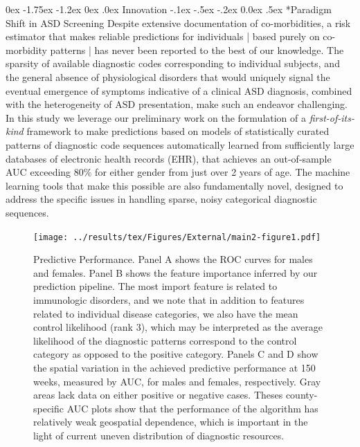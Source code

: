 \documentclass[onecolumn, compsoc,11pt]{IEEEtran}
\makeatletter
\renewcommand\subsection{\@startsection {subsection}{2}{\z@}%
                                   {0ex \@plus -1.75ex \@minus -1.2ex}%
                                   {0ex \@plus.0ex}%
                                   {\fontsize{11}{11}\selectfont\bfseries\sffamily\color{black}}}
\renewcommand\paragraph{\@startsection {section}{1}{\z@}%
                                   {-.1ex \@plus -.5ex \@minus -.2ex}%
                                   {0.0ex \@plus.5ex}%
                                   {\fontsize{11}{10}\selectfont\bfseries\itshape\sffamily\color{black}}}
\renewcommand{\captionN}[1]{\caption{\color{CadetBlue4!80!black} \sffamily \fontsize{9}{10}\selectfont #1  }}
\def\treatment{positive\xspace}
\makeatother
\begin{document}
 \subsection{Innovation}
\paragraph*{Paradigm Shift in ASD Screening} Despite extensive documentation of co-morbidities,   a risk estimator that makes reliable predictions for  individuals | based purely on co-morbidity patterns |  has never been reported to the best of our knowledge. The sparsity of available diagnostic codes corresponding to 
individual subjects, and the general absence of physiological disorders  that would uniquely signal the eventual emergence of symptoms indicative of a clinical ASD diagnosis, combined with the heterogeneity of ASD presentation,  make such an endeavor challenging. In this study we leverage our preliminary work on  the  formulation of a \textit{first-of-its-kind}  framework to make predictions 
based on models of statistically curated patterns of diagnostic code sequences automatically learned from  sufficiently large databases of electronic health records (EHR), that  achieves an out-of-sample AUC exceeding  $80\%$ for  either gender from just over 2 years of age. The machine learning tools that make this possible are also fundamentally novel, designed to address the specific issues in handling sparse, noisy categorical diagnostic sequences. 
\begin{figure}[t]
  \texttt{[image: ../results/tex/Figures/External/main2-figure1.pdf]}
     \vspace{-15pt}

  \captionN{Predictive Performance. Panel 
       A shows the ROC curves for males and females. Panel B shows the feature importance inferred by our prediction pipeline. The most import feature is related to immunologic disorders, and we note that in addition to features related to individual disease categories, we also have the mean control likelihood (rank 3), which may be interpreted as the average likelihood of the diagnostic patterns correspond to the control category as opposed to the \treatment category. Panels C and D show the spatial variation in the achieved predictive performance at 150 weeks, measured by AUC, for males and females, respectively. Gray areas lack data on either positive or negative cases. Theses county-specific AUC plots show that the performance of the algorithm has  relatively weak geospatial dependence, which is important in the light of current uneven distribution of diagnostic resources.
     }\label{fig1}
        \vspace{-15pt}

\end{figure}
\end{document}
